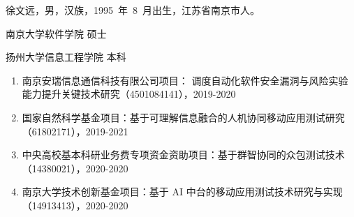 \documentclass[master]{NJUthesis}
\theoremstyle{plain}
\begin{document}
\tableofcontents
{}


\renewcommand*{\listtablename}{表~~目~~录}
\listoftables
{}
\renewcommand*{\listfigurename}{图~~目~~录}
\listoffigures
{}

%

\mainmatter











\newpage


\makeatletter
\ifNJUT@review%
\else%

\vspace{1ex}
\noindent 徐文远，男，汉族，1995~年~8~月出生，江苏省南京市人。
\vspace{2ex}

\begin{description}[labelindent=0em, leftmargin=8em, style=sameline]
\item[2018.9～2020.6] 南京大学软件学院 \hfill 硕士
\item[2014.9～2018.6] 扬州大学信息工程学院 \hfill 本科
\end{description}


\begin{enumerate}[label=\arabic*., labelindent=0em, leftmargin=*]
    \item 南京安瑞信息通信科技有限公司项目： 调度自动化软件安全漏洞与风险实验能力提升关键技术研究（4501084141），2019-2020
    \item 国家自然科学基金项目：基于可理解信息融合的人机协同移动应用测试研究（61802171），2019-2021
    \item 中央高校基本科研业务费专项资金资助项目：基于群智协同的众包测试技术（14380021），2020-2020
    \item 南京大学技术创新基金项目：基于 AI 中台的移动应用测试技术研究与实现（14913413），2020-2020
\end{enumerate}
\end{document}

